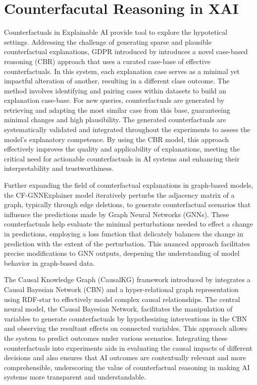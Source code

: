 \section{Counterfacutal Reasoning in XAI}

Counterfactuals in Explainable AI provide tool to explore the hypotetical
settings. Addressing the challenge of generating sparse and plausible counterfactual
explanations, GDPR introduced by \textcite{watson_good_2020} introduces a novel case-based
reasoning (CBR) approach that uses a curated case-base of effective counterfactuals.
In this system, each explanation case serves as a minimal yet impactful alteration
of another, resulting in a different class outcome. The method involves identifying
and pairing cases within datasets to build an explanation case-base. For new
queries, counterfactuals are generated by retrieving and adapting the most similar
case from this base, guaranteeing minimal changes and high plausibility. The generated
counterfactuals are systematically validated and integrated throughout the experiments
to assess the model’s explanatory competence. By using the CBR model, this approach
effectively improves the quality and applicability of explanations, meeting the
critical need for actionable counterfactuals in AI systems and enhancing their
interpretability and trustworthiness.

Further expanding the field of counterfactual explanations in graph-based models,
the CF-GNNExplainer model \parencite{lucic_cf-gnnexplainer_2021} iteratively
perturbs the adjacency matrix of a graph, typically through edge deletions, to
generate counterfactual scenarios that influence the predictions made by Graph
Neural Networks (GNNs). These counterfactuals help evaluate the minimal perturbations
needed to effect a change in predictions, employing a loss function that
delicately balances the change in prediction with the extent of the perturbation.
This nuanced approach facilitates precise modifications to GNN outputs,
deepening the understanding of model behavior in graph-based data.

The Causal Knowledge Graph (CausalKG) framework introduced by \textcite{jaimini_causalkg_2022}
integrates a Causal Bayesian Network (CBN) and a hyper-relational graph representation
using RDF-star to effectively model complex causal relationships. The central
neural model, the Causal Bayesian Network, facilitates the manipulation of
variables to generate counterfactuals by hypothesizing interventions in the CBN
and observing the resultant effects on connected variables. This approach allows
the system to predict outcomes under various scenarios. Integrating these
counterfactuals into experiments aids in evaluating the causal impacts of
different decisions and also ensures that AI outcomes are contextually relevant
and more comprehensible, underscoring the value of counterfactual reasoning in making
AI systems more transparent and understandable.


